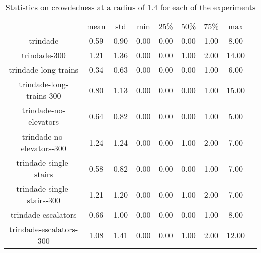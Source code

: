 \begin{table*}
    \begin{tabular}{|c|cccccccc|}
      & mean & std & min & 25\% & 50\% & 75\% & max \\
    trindade  & 0.59 & 0.90 & 0.00 & 0.00 & 0.00 & 1.00 & 8.00 \\
    trindade-300  & 1.21 & 1.36 & 0.00 & 0.00 & 1.00 & 2.00 & 14.00 \\
    trindade-long-trains  & 0.34 & 0.63 & 0.00 & 0.00 & 0.00 & 1.00 & 6.00 \\
    trindade-long-trains-300  & 0.80 & 1.13 & 0.00 & 0.00 & 0.00 & 1.00 & 15.00 \\
    trindade-no-elevators  & 0.64 & 0.82 & 0.00 & 0.00 & 0.00 & 1.00 & 5.00 \\
    trindade-no-elevators-300  & 1.24 & 1.24 & 0.00 & 0.00 & 1.00 & 2.00 & 7.00 \\
    trindade-single-stairs  & 0.58 & 0.82 & 0.00 & 0.00 & 0.00 & 1.00 & 7.00 \\
    trindade-single-stairs-300  & 1.21 & 1.20 & 0.00 & 0.00 & 1.00 & 2.00 & 7.00 \\
    trindade-escalators  & 0.66 & 1.00 & 0.00 & 0.00 & 0.00 & 1.00 & 8.00 \\
    trindade-escalators-300  & 1.08 & 1.41 & 0.00 & 0.00 & 1.00 & 2.00 & 12.00 \\
    \end{tabular}
\caption{Statistics on crowdedness at a radius of 1.4 for each of the experiments}
\label{annex:crowdedness_1.4}

\end{table*} 